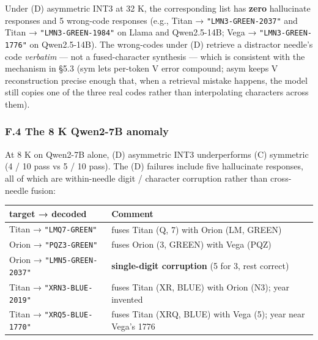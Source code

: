 \documentclass[
]{article}
\newcounter{none} %
\begin{document}
Under (D) asymmetric INT3 at 32 K, the corresponding list has
\textbf{zero} hallucinate responses and 5 wrong-code responses (e.g.,
Titan → \texttt{"LMN3-GREEN-2037"} and Titan →
\texttt{"LMN3-GREEN-1984"} on Llama and Qwen2.5-14B; Vega →
\texttt{"LMN3-GREEN-1776"} on Qwen2.5-14B). The wrong-codes under (D)
retrieve a distractor needle's code \emph{verbatim} --- not a
fused-character synthesis --- which is consistent with the mechanism in
§5.3 (sym lets per-token V error compound; asym keeps V reconstruction
precise enough that, when a retrieval mistake happens, the model still
copies one of the three real codes rather than interpolating characters
across them).

\subsubsection{F.4 The 8 K Qwen2-7B
anomaly}\label{f.4-the-8-k-qwen2-7b-anomaly}

At 8 K on Qwen2-7B alone, (D) asymmetric INT3 underperforms (C)
symmetric (4 / 10 pass vs 5 / 10 pass). The (D) failures include five
hallucinate responses, all of which are within-needle digit / character
corruption rather than cross-needle fusion:

{\def\LTcaptype{none} %
\begin{longtable}[]{@{}
  >{\raggedright\arraybackslash}p{}
  >{\raggedright\arraybackslash}p{}@{}}
\toprule\noalign{}
\begin{minipage}[b]{\linewidth}\raggedright
target → decoded
\end{minipage} & \begin{minipage}[b]{\linewidth}\raggedright
Comment
\end{minipage} \\
\midrule\noalign{}
\endhead
\bottomrule\noalign{}
\endlastfoot
Titan → \texttt{"LMQ7-GREEN"} & fuses Titan (Q, 7) with Orion (LM,
GREEN) \\
Orion → \texttt{"PQZ3-GREEN"} & fuses Orion (3, GREEN) with Vega
(PQZ) \\
Orion → \texttt{"LMN5-GREEN-2037"} & \textbf{single-digit corruption} (5
for 3, rest correct) \\
Titan → \texttt{"XRN3-BLUE-2019"} & fuses Titan (XR, BLUE) with Orion
(N3); year invented \\
Titan → \texttt{"XRQ5-BLUE-1770"} & fuses Titan (XRQ, BLUE) with Vega
(5); year near Vega's 1776 \\
\end{longtable}
}
\end{document}
